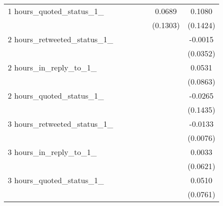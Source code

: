 {\begin{tabular}{l*{6}{c}}
1 hours\_quoted\_status\_1\_&                     &                     &                     &                     &      0.0689         &      0.1080         \\
                    &                     &                     &                     &                     &    (0.1303)         &    (0.1424)         \\
2 hours\_retweeted\_status\_1\_&                     &                     &                     &                     &                     &     -0.0015         \\
                    &                     &                     &                     &                     &                     &    (0.0352)         \\
2 hours\_in\_reply\_to\_1\_&                     &                     &                     &                     &                     &      0.0531         \\
                    &                     &                     &                     &                     &                     &    (0.0863)         \\
2 hours\_quoted\_status\_1\_&                     &                     &                     &                     &                     &     -0.0265         \\
                    &                     &                     &                     &                     &                     &    (0.1435)         \\
3 hours\_retweeted\_status\_1\_&                     &                     &                     &                     &                     &     -0.0133\sym{*}  \\
                    &                     &                     &                     &                     &                     &    (0.0076)         \\
3 hours\_in\_reply\_to\_1\_&                     &                     &                     &                     &                     &      0.0033         \\
                    &                     &                     &                     &                     &                     &    (0.0621)         \\
3 hours\_quoted\_status\_1\_&                     &                     &                     &                     &                     &      0.0510         \\
                    &                     &                     &                     &                     &                     &    (0.0761)         \\

\end{tabular}}
